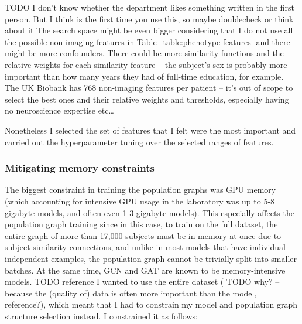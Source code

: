 TODO  I don't know whether the department likes something written in the first person. But I think is the first time you use this, so maybe doublecheck or think about it
The search space might be even bigger considering that I do not use all the possible non-imaging features in Table~\ref{table:phenotype-features} and there might be more confounders. There could be more similarity functions and the relative weights for each similarity feature – the subject's sex is probably more important than how many years they had of full-time education, for example. The UK Biobank has 768 non-imaging features per patient – it's out of scope to select the best ones and their relative weights and thresholds, especially having no neuroscience expertise etc\dots


Nonetheless I selected the set of features that I felt were the most important and carried out the hyperparameter tuning over the selected ranges of features.

\subsubsection{Mitigating memory constraints}
\label{section:memory}
The biggest constraint in training the population graphs was GPU memory (which accounting for intensive GPU usage in the laboratory was up to 5-8 gigabyte models, and often even 1-3 gigabyte models). This especially affects the population graph training since in this case, to train on the full dataset, the entire graph of more than 17,000 subjects must be in memory at once due to subject similarity connections, and unlike in most models that have individual independent examples, the population graph cannot be trivially split into smaller batches. At the same time, GCN and GAT are known to be memory-intensive models.
TODO reference
I wanted to use the entire dataset (
TODO why? – because the (quality of) data is often more important than the model, reference?),
which meant that I had to constrain my model and population graph structure selection instead. I constrained it as follows:

